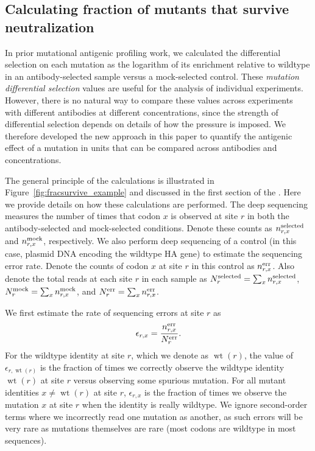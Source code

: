 \documentclass[11pt]{article}
\begin{document}
\subsection*{Calculating fraction of mutants that survive neutralization}
In prior mutational antigenic profiling work\cite{doud2017complete,dingens2017comprehensive}, we calculated the differential selection on each mutation as the logarithm of its enrichment relative to wildtype in an antibody-selected sample versus a mock-selected control.
These \emph{mutation differential selection} values are useful for the analysis of individual experiments.
However, there is no natural way to compare these values across experiments with different antibodies at different concentrations, since the strength of differential selection depends on details of how the pressure is imposed.
We therefore developed the new approach in this paper to quantify the antigenic effect of a mutation in units that can be compared across antibodies and concentrations.

The general principle of the calculations is illustrated in Figure~\ref{fig:fracsurvive_example} and discussed in the first section of the .
Here we provide details on how these calculations are performed.
The deep sequencing measures the number of times that codon $x$ is observed at site $r$ in both the antibody-selected and mock-selected conditions. 
Denote these counts as $n_{r,x}^{\rm{selected}}$ and $n_{r,x}^{\rm{mock}}$, respectively.
We also perform deep sequencing of a control (in this case, plasmid DNA encoding the wildtype HA gene) to estimate the sequencing error rate.
Denote the counts of codon $x$ at site $r$ in this control as $n_{r,x}^{\rm{err}}$.
Also denote the total reads at each site $r$ in each sample as
$N_{r}^{\rm{selected}} = \sum_x n_{r,x}^{\rm{selected}}$,
$N_{r}^{\rm{mock}} = \sum_x n_{r,x}^{\rm{mock}}$, and
$N_{r}^{\rm{err}} = \sum_x n_{r,x}^{\rm{err}}$.

We first estimate the rate of sequencing errors at site $r$ as
\begin{equation}
\label{eq:epsilonrx}
\epsilon_{r,x} = \frac{n_{r,x}^{\rm{err}}}{N_{r}^{\rm{err}}}.
\end{equation}
For the wildtype identity at site $r$, which we denote as $\operatorname{wt}\left(r\right)$, the value of $\epsilon_{r,\operatorname{wt}\left(r\right)}$ is the fraction of times we correctly observe the wildtype identity $\operatorname{wt}\left(r\right)$ at site $r$ versus observing some spurious mutation. 
For all mutant identities $x \ne \operatorname{wt}\left(r\right)$ at site $r$, $\epsilon_{r,x}$ is the fraction of times we observe the mutation $x$ at site $r$ when the identity is really wildtype.
We ignore second-order terms where we incorrectly read one mutation as another, as such errors will be very rare as mutations themselves are rare (most codons are wildtype in most sequences). 
\end{document}
